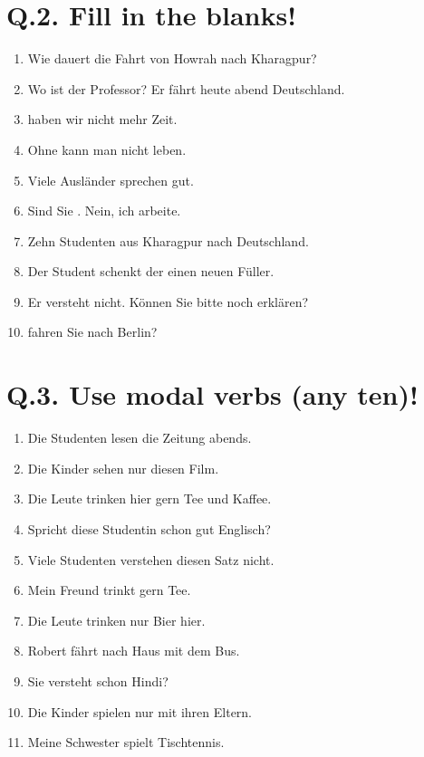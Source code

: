 \documentclass[12pt,a4paper]{article}
\begin{document}
\section*{Q.2. Fill in the blanks!}

\begin{enumerate}
    \item Wie\underline{\hspace{2cm}} dauert die Fahrt von Howrah nach Kharagpur?
    \item Wo ist der Professor? Er fährt heute abend \underline{\hspace{2cm}} Deutschland.
    \item \underline{\hspace{2cm}} haben wir nicht mehr Zeit.
    \item Ohne \underline{\hspace{2cm}} kann man nicht leben.
    \item Viele Ausländer sprechen \underline{\hspace{2cm}} gut.
    \item Sind Sie \underline{\hspace{2cm}}. Nein, ich arbeite.
    \item Zehn Studenten aus Kharagpur \underline{\hspace{2cm}} nach Deutschland.
    \item Der Student schenkt der\underline{\hspace{2cm}} einen neuen Füller.
    \item Er versteht nicht. Können Sie bitte noch \underline{\hspace{2cm}} erklären?
    \item \underline{\hspace{2cm}} fahren Sie nach Berlin?
\end{enumerate}

\section*{Q.3. Use modal verbs (any ten)!}

\begin{enumerate}
    \item Die Studenten lesen die Zeitung abends.
    \item Die Kinder sehen nur diesen Film.
    \item Die Leute trinken hier gern Tee und Kaffee.
    \item Spricht diese Studentin schon gut Englisch?
    \item Viele Studenten verstehen diesen Satz nicht.
    \item Mein Freund trinkt gern Tee.
    \item Die Leute trinken nur Bier hier.
    \item Robert fährt nach Haus mit dem Bus.
    \item Sie versteht schon Hindi?
    \item Die Kinder spielen nur mit ihren Eltern.
    \item Meine Schwester spielt Tischtennis.
\end{enumerate}
\end{document}
